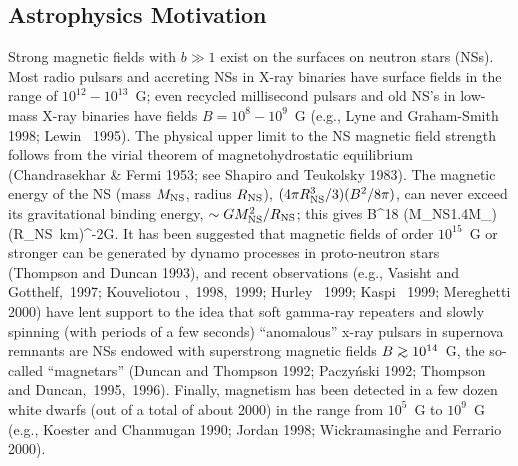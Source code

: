 \subsection{Astrophysics Motivation}

Strong magnetic fields with $b\gg 1$ exist on the surfaces on 
neutron stars (NSs). Most radio pulsars and accreting NSs in
X-ray binaries have surface fields in the range of $10^{12}-10^{13}$~G;
even recycled millisecond pulsars and old NS's in low-mass X-ray
binaries have fields $B=10^8-10^9$~G (e.g., 
Lyne and Graham-Smith 1998; Lewin \etal~1995). The physical
upper limit to the NS magnetic field strength follows from the
virial theorem of magnetohydrostatic equilibrium (Chandrasekhar \& Fermi 1953;
see Shapiro and Teukolsky 1983). 
The magnetic energy of the NS (mass $M_{\rm NS}$, radius $R_{\rm NS}$),
$(4\pi R_{\rm NS}^3/3)(B^2/8\pi)$, can never exceed its gravitational binding
energy, $\sim GM_{\rm NS}^2/R_{\rm NS}$; this gives
\be
B^{18} \left({M_{\rm NS}\over 1.4M_\odot}\right)\left({R_{\rm NS}~{\rm km}}\right)^{-2}{\rm G}.
\ee
It has been suggested that magnetic fields of
order $10^{15}$~G or stronger can be generated by dynamo processes in
proto-neutron stars (Thompson and Duncan 1993), and recent
observations (e.g., Vasisht and Gotthelf,~1997; Kouveliotou \etal,~1998,~1999;
Hurley \etal~1999; Kaspi \etal~1999; Mereghetti 2000) have lent support to
the idea that soft
gamma-ray repeaters and slowly spinning (with periods of a few seconds)
``anomalous'' x-ray pulsars in supernova remnants are NSs endowed
with superstrong magnetic fields $B\go 10^{14}$~G, the so-called ``magnetars'' 
(Duncan and Thompson 1992; Paczy\'nski 1992;
Thompson and Duncan,~1995,~1996). Finally, magnetism has been detected in 
a few dozen white dwarfs (out of a total of about 2000) in the range from
$10^5$~G to $10^9$~G (e.g., Koester and Chanmugan 1990; Jordan 1998;
Wickramasinghe and Ferrario 2000).

